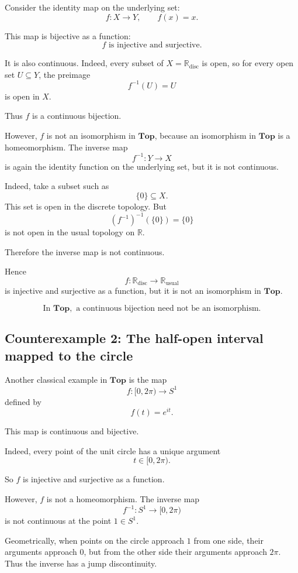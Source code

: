 \documentclass[12pt,a4paper]{article}
\theoremstyle{notespace}
\begin{document}
Consider the identity map on the underlying set:
\[
f:X\to Y,
\qquad
f(x)=x.
\]

This map is bijective as a function:
\[
f \text{ is injective and surjective}.
\]

It is also continuous. Indeed, every subset of \(X=\mathbb R_{\mathrm{disc}}\) is open, so for every open set \(U\subseteq Y\), the preimage
\[
f^{-1}(U)=U
\]
is open in \(X\).

Thus \(f\) is a continuous bijection.

However, \(f\) is not an isomorphism in \(\mathbf{Top}\), because an isomorphism in \(\mathbf{Top}\) is a homeomorphism. The inverse map
\[
f^{-1}:Y\to X
\]
is again the identity function on the underlying set, but it is not continuous.

Indeed, take a subset such as
\[
\{0\}\subseteq X.
\]
This set is open in the discrete topology. But
\[
(f^{-1})^{-1}(\{0\})=\{0\}
\]
is not open in the usual topology on \(\mathbb R\).

Therefore the inverse map is not continuous.

Hence
\[
f:\mathbb R_{\mathrm{disc}}\to \mathbb R_{\mathrm{usual}}
\]
is injective and surjective as a function, but it is not an isomorphism in \(\mathbf{Top}\).

\[
\boxed{
	\text{In } \mathbf{Top},\text{ a continuous bijection need not be an isomorphism.}
}
\]

\subsection{Counterexample 2: The half-open interval mapped to the circle}

Another classical example in \(\mathbf{Top}\) is the map
\[
f:[0,2\pi)\to S^1
\]
defined by
\[
f(t)=e^{it}.
\]

This map is continuous and bijective.

Indeed, every point of the unit circle has a unique argument
\[
t\in [0,2\pi).
\]

So \(f\) is injective and surjective as a function.

However, \(f\) is not a homeomorphism. The inverse map
\[
f^{-1}:S^1\to [0,2\pi)
\]
is not continuous at the point \(1\in S^1\).

Geometrically, when points on the circle approach \(1\) from one side, their arguments approach \(0\), but from the other side their arguments approach \(2\pi\). Thus the inverse has a jump discontinuity.
\end{document}
